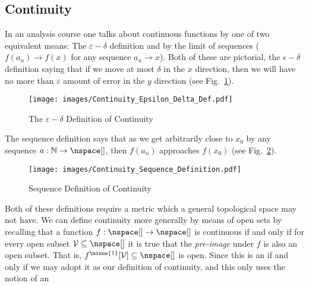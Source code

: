 \documentclass[oneside]{book}                                                  %
\begin{document}
            \subsection{Continuity}
                In an analysis course one talks about continuous functions by
                one of two equivalent means: The $\varepsilon-\delta$ definition
                and by the limit of sequences ($f(a_{n})\rightarrow{f}(x)$ for
                any sequence $a_{n}\rightarrow{x}$). Both of these are
                pictorial, the $\epsilon-\delta$ definition saying that if we
                move at most $\delta$ in the $x$ direction, then we will have
                no more than $\varepsilon$ amount of error in the $y$ direction
                (see Fig.~\ref{fig:Eps_Delta_Def_Cont}).
                \begin{figure}[H]
                    \centering
                    \captionsetup{type=figure}
                    \texttt{[image: images/Continuity\_Epsilon\_Delta\_Def.pdf]}
                    \caption{The $\varepsilon-\delta$ Definition of Continuity}
                    \label{fig:Eps_Delta_Def_Cont}
                \end{figure}
                The sequence definition says that as we get arbitrarily close to
                $x_{0}$ by any sequence $a:\mathbb{N}\rightarrow\nspace[]$, then
                $f(a_{n})$ approaches $f(x_{0})$
                (see Fig.~\ref{fig:Sequence_Def_Continuity}).
                \begin{figure}[H]
                    \centering
                    \captionsetup{type=figure}
                    \texttt{[image: images/Continuity\_Sequence\_Definition.pdf]}
                    \caption{Sequence Definition of Continuity}
                    \label{fig:Sequence_Def_Continuity}
                \end{figure}
                Both of these definitions require a metric which a general
                topological space may not have. We can define continuity more
                generally by means of open sets by recalling that a function
                $f:\nspace[]\rightarrow\nspace[]$ is continuous if and only if
                for every open subset $\mathcal{V}\subseteq\nspace[]$ it is true
                that the \textit{pre-image} under $f$ is also an open subset.
                That is, $f^{\minus{1}}[\mathcal{V}]\subseteq\nspace[]$ is open.
                Since this is an if and only if we may adopt it as our
                definition of continuity, and this only uses the notion of an
\end{document}
